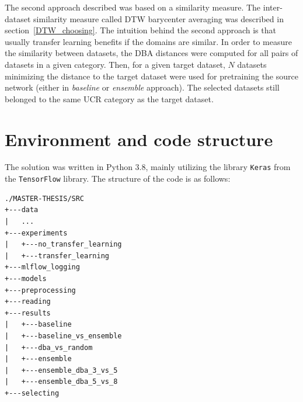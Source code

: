 \documentclass[a4paper,11pt,twoside]{report}
\theoremstyle{definition}
\begin{document}
The second approach described was based on a similarity measure. The inter-dataset similarity measure called DTW barycenter averaging was described in section~\ref{DTW_choosing}. The intuition behind the second approach is that usually transfer learning benefits if the domains are similar. In order to measure the similarity between datasets, the DBA distances were computed for all pairs of datasets in a given category. Then, for a given target dataset, $N$ datasets minimizing the distance to the target dataset were used for pretraining the source network (either in \textit{baseline} or \textit{ensemble} approach). The selected datasets still belonged to the same UCR category as the target dataset.
\section{Environment and code structure}
The solution was written in Python 3.8, mainly utilizing the library \texttt{Keras} from the \texttt{TensorFlow} library. The structure of the code is as follows:

\begin{verbatim}
./MASTER-THESIS/SRC
+---data
|   ...
+---experiments
|   +---no_transfer_learning
|   +---transfer_learning
+---mlflow_logging
+---models
+---preprocessing
+---reading
+---results
|   +---baseline
|   +---baseline_vs_ensemble
|   +---dba_vs_random
|   +---ensemble
|   +---ensemble_dba_3_vs_5
|   +---ensemble_dba_5_vs_8
+---selecting
\end{verbatim}
\end{document}
